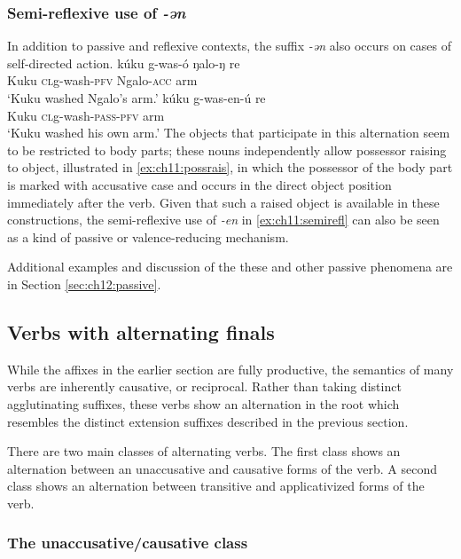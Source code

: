 
\subsubsection{Semi-reflexive use of \textit{-ən}}

In addition to passive and reflexive contexts, the suffix \textit{-ən} also occurs on cases of self-directed action.
\ea \ea \gll kúku g-was-ó ŋalo-ŋ re	\\	
Kuku \textsc{cl}g-wash-\textsc{pfv} Ngalo-\textsc{acc} arm \\
\glt ‘Kuku washed Ngalo’s arm.’ \label{ex:ch11:possrais}
\ex \gll kúku g-was-en-ú re				\\
Kuku \textsc{cl}g-wash-\textsc{pass-pfv} arm \\
\glt ‘Kuku washed his own arm.’\label{ex:ch11:semirefl}
\z 
\z 
The objects that participate in this alternation seem to be restricted to body parts; these nouns independently allow possessor raising to object, illustrated in \ref{ex:ch11:possrais}, in which the possessor of the body part is marked with accusative case and occurs in the direct object position immediately after the verb. Given that such a raised object is available in these constructions, the semi-reflexive use of \textit{-en} in \ref{ex:ch11:semirefl} can also be seen as a kind of passive or valence-reducing mechanism. 

Additional examples and discussion of the these and other passive phenomena are in Section \ref{sec:ch12:passive}.


\subsection{Verbs with alternating finals}

While the affixes in the earlier section are fully productive, the semantics of many verbs are inherently causative, or reciprocal. Rather than taking distinct agglutinating suffixes, these verbs show an alternation in the root which resembles the distinct extension suffixes described in the previous section.

There are two main classes of alternating verbs. The first class shows an alternation between an unaccusative and causative forms of the verb. A second class shows an alternation between transitive and applicativized forms of the verb. 


\subsubsection{The unaccusative/causative class}\label{sec:ch11:ucalt}

